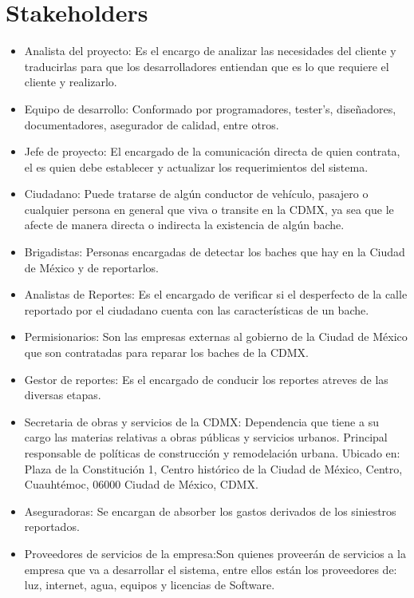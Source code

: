 \chapter{Stakeholders}
\begin{itemize}
    \item Analista del proyecto: Es el encargo de analizar las necesidades del cliente y traducirlas para que los desarrolladores entiendan que es lo que requiere el cliente y realizarlo.
    \item Equipo de desarrollo: Conformado por programadores, tester’s, diseñadores, documentadores, asegurador de calidad, entre otros.
    \item Jefe de proyecto: El encargado de la comunicación directa de quien contrata, el es quien debe establecer y actualizar los requerimientos del sistema.
    \item Ciudadano: Puede tratarse de algún conductor de vehículo, pasajero o cualquier persona en general que viva o transite en la CDMX, ya sea que le afecte de manera directa o indirecta la existencia de algún bache.
    \item Brigadistas: Personas encargadas de detectar los baches que hay en la Ciudad de México y de reportarlos.
    \item Analistas de Reportes: Es el encargado de verificar si el desperfecto de la calle reportado por el ciudadano cuenta con las características de un bache. 
    \item Permisionarios: Son las empresas externas al gobierno de la Ciudad de México que son contratadas para reparar los baches de la CDMX.
    \item Gestor de reportes: Es el encargado de conducir los reportes atreves de las diversas etapas.
    \item Secretaria de obras y servicios de la CDMX: Dependencia que tiene a su cargo las materias relativas a obras públicas y servicios urbanos. Principal responsable de políticas de construcción y remodelación urbana. Ubicado en: Plaza de la Constitución 1, Centro  histórico de la Ciudad de México, Centro, Cuauhtémoc, 06000 Ciudad de México, CDMX.
    \item Aseguradoras: Se encargan de absorber los gastos derivados de los siniestros reportados.
    \item Proveedores de servicios de la empresa:Son quienes proveerán de servicios a la empresa que va a desarrollar el sistema, entre ellos están los proveedores de: luz, internet, agua, equipos y licencias de Software.
\end{itemize}


